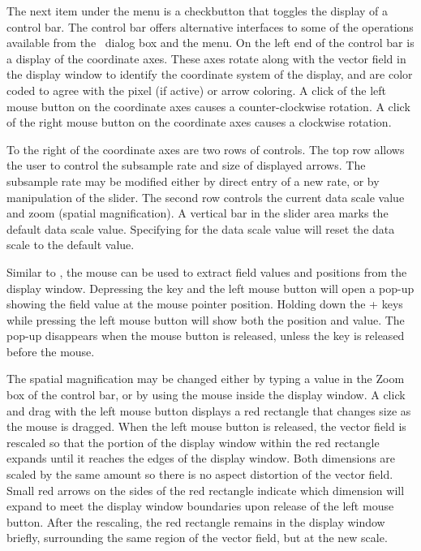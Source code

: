 The next item under the  menu is a checkbutton that
toggles the display of a control bar.  The control bar offers
alternative interfaces to some of the operations available from the
\ dialog box and the  menu.
On the left end of the control bar is a display of the coordinate axes.
These axes rotate along with the vector field in the display window to
identify the coordinate system of the display, and are color coded to
agree with the pixel (if active) or arrow coloring.  A click of the left
mouse button on the coordinate axes causes a counter-clockwise rotation.
A click of the right mouse button on the coordinate axes causes a
clockwise rotation.

To the right of the coordinate axes are two rows of controls.  The top
row allows the user to control the subsample rate and size of displayed
arrows.  The subsample rate may be modified either by direct entry of a
new rate, or by manipulation of the slider.  The second row controls the
current data scale value and zoom (spatial magnification).  A vertical
bar in the slider area marks the default data scale value.  Specifying
 for the data scale value will reset the data scale to the
default value.

Similar to , the mouse can be
used to extract field values and positions from the display
window. Depressing the  key and the left mouse button will
open a pop-up showing the field value at the mouse pointer
position. Holding down the + keys while pressing
the left mouse button will show both the position and value. The pop-up
disappears when the mouse button is released, unless the  key
is released before the mouse.

The spatial magnification may be changed either by typing a value in the
Zoom box of the control bar, or by using the mouse inside the display
window.  A click and drag with the left mouse button displays a red
rectangle that changes size as the mouse is dragged.  When the left
mouse button is released, the vector field is rescaled so that the
portion of the display window within the red rectangle expands until it
reaches the edges of the display window.  Both dimensions are scaled by
the same amount so there is no aspect distortion of the vector field.
Small red arrows on the sides of the red rectangle indicate which
dimension will expand to meet the display window boundaries upon release
of the left mouse button.  After the rescaling, the red rectangle
remains in the display window briefly, surrounding the same region of
the vector field, but at the new scale.

